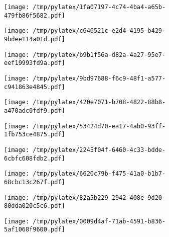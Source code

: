 \documentclass{article}
\begin{document}
\begin{figure}[htbp]
\begin{subfigure}[b]{.3\linewidth}
\texttt{[image: /tmp/pylatex/1fa07197-4c74-4ba4-a65b-479fb86f5682.pdf]}
\end{subfigure}
\begin{subfigure}[b]{.3\linewidth}
\texttt{[image: /tmp/pylatex/c646521c-e2d4-4195-b429-9bdee114a01d.pdf]}
\end{subfigure}
\begin{subfigure}[b]{.3\linewidth}
\texttt{[image: /tmp/pylatex/b9b1f56a-d82a-4a27-95e7-eef19993fd9a.pdf]}
\end{subfigure}
\begin{subfigure}[b]{.3\linewidth}
\texttt{[image: /tmp/pylatex/9bd97688-f6c9-48f1-a577-c941863e4845.pdf]}
\end{subfigure}
\begin{subfigure}[b]{.3\linewidth}
\texttt{[image: /tmp/pylatex/420e7071-b708-4822-88b8-a470adc0fdf9.pdf]}
\end{subfigure}
\begin{subfigure}[b]{.3\linewidth}
\texttt{[image: /tmp/pylatex/53424d70-ea17-4ab0-93ff-1fb753ce4875.pdf]}
\end{subfigure}
\begin{subfigure}[b]{.3\linewidth}
\texttt{[image: /tmp/pylatex/2245f04f-6460-4c33-bdde-6cbfc608fdb2.pdf]}
\end{subfigure}
\begin{subfigure}[b]{.3\linewidth}
\texttt{[image: /tmp/pylatex/6620c79b-f475-41a0-b1b7-68cbc13c267f.pdf]}
\end{subfigure}
\begin{subfigure}[b]{.3\linewidth}
\texttt{[image: /tmp/pylatex/82a5b229-2942-408e-9d20-80dda020c5c6.pdf]}
\end{subfigure}
\begin{subfigure}[b]{.3\linewidth}
\texttt{[image: /tmp/pylatex/0009d4af-71ab-4591-b836-5af1068f9600.pdf]}
\end{subfigure}
\end{figure}
\end{document}

